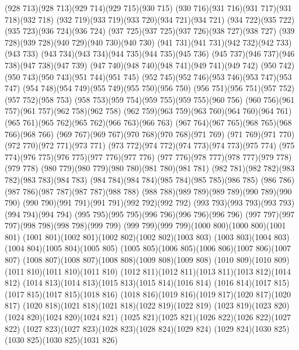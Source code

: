 \cpath (928 713)(928 713)(929 714)(929 715)(930 715)
\cpath (930 716)(931 716)(931 717)(931 718)(932 718)
\cpath (932 719)(933 719)(933 720)(934 721)(934 721)
\cpath (934 722)(935 722)(935 723)(936 724)(936 724)
\cpath (937 725)(937 725)(937 726)(938 727)(938 727)
\cpath (939 728)(939 728)(940 729)(940 730)(940 730)
\cpath (941 731)(941 731)(942 732)(942 733)(943 733)
\cpath (943 734)(943 734)(944 735)(944 735)(945 736)
\cpath (945 737)(946 737)(946 738)(947 738)(947 739)
\cpath (947 740)(948 740)(948 741)(949 741)(949 742)
\cpath (950 742)(950 743)(950 743)(951 744)(951 745)
\cpath (952 745)(952 746)(953 746)(953 747)(953 747)
\cpath (954 748)(954 749)(955 749)(955 750)(956 750)
\cpath (956 751)(956 751)(957 752)(957 752)(958 753)
\cpath (958 753)(959 754)(959 755)(959 755)(960 756)
\cpath (960 756)(961 757)(961 757)(962 758)(962 758)
\cpath (962 759)(963 759)(963 760)(964 760)(964 761)
\cpath (965 761)(965 762)(965 762)(966 763)(966 763)
\cpath (967 764)(967 765)(968 765)(968 766)(968 766)
\cpath (969 767)(969 767)(970 768)(970 768)(971 769)
\cpath (971 769)(971 770)(972 770)(972 771)(973 771)
\cpath (973 772)(974 772)(974 773)(974 773)(975 774)
\cpath (975 774)(976 775)(976 775)(977 776)(977 776)
\cpath (977 776)(978 777)(978 777)(979 778)(979 778)
\cpath (980 779)(980 779)(980 780)(981 780)(981 781)
\cpath (982 781)(982 782)(983 782)(983 783)(984 783)
\cpath (984 784)(984 784)(985 784)(985 785)(986 785)
\cpath (986 786)(987 786)(987 787)(987 787)(988 788)
\cpath (988 788)(989 789)(989 789)(990 789)(990 790)
\cpath (990 790)(991 791)(991 791)(992 792)(992 792)
\cpath (993 793)(993 793)(993 793)(994 794)(994 794)
\cpath (995 795)(995 795)(996 796)(996 796)(996 796)
\cpath (997 797)(997 797)(998 798)(998 798)(999 799)
\cpath (999 799)(999 799)(1000 800)(1000 800)(1001 801)
\cpath (1001 801)(1002 801)(1002 802)(1002 802)(1003 803)
\cpath (1003 803)(1004 803)(1004 804)(1005 804)(1005 805)
\cpath (1005 805)(1006 805)(1006 806)(1007 806)(1007 807)
\cpath (1008 807)(1008 807)(1008 808)(1009 808)(1009 808)
\cpath (1010 809)(1010 809)(1011 810)(1011 810)(1011 810)
\cpath (1012 811)(1012 811)(1013 811)(1013 812)(1014 812)
\cpath (1014 813)(1014 813)(1015 813)(1015 814)(1016 814)
\cpath (1016 814)(1017 815)(1017 815)(1017 815)(1018 816)
\cpath (1018 816)(1019 816)(1019 817)(1020 817)(1020 817)
\cpath (1020 818)(1021 818)(1021 818)(1022 819)(1022 819)
\cpath (1023 819)(1023 820)(1024 820)(1024 820)(1024 821)
\cpath (1025 821)(1025 821)(1026 822)(1026 822)(1027 822)
\cpath (1027 823)(1027 823)(1028 823)(1028 824)(1029 824)
\cpath (1029 824)(1030 825)(1030 825)(1030 825)(1031 826)
